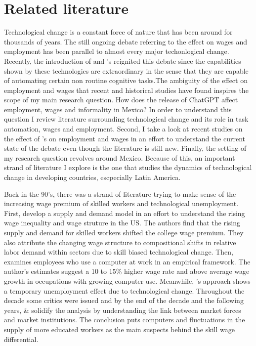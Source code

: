 \section{Related literature}

Technological change is a constant force of nature that has been around for thousands of years. The still ongoing debate referring to the effect on wages and employment has been parallel to almost every major techonlogical change. Recently, the introduction of  and 's reignited this debate since the capabilities shown by these technologies are extraordinary in the sense that they are capable of automating certain non routine cognitive tasks.The ambiguity of the effect on employment and wages that recent and historical studies have found inspires the scope of my main research question. How does the release of ChatGPT affect employment, wages and informality in Mexico? In order to understand this question I review literature surrounding technological change and its role in task automation, wages and employment. Second, I take a look at recent studies on the effect of 's on employment and wages in an effort to understand the current state of the debate even though the literature is still new. Finally, the setting of my research question revolves around Mexico. Because of this, an important strand of literature I explore is the one that studies the dynamics of technological change in developing countries, escpecially Latin America.

Back in the 90's, there was a strand of literature trying to make sense of the increasing wage premium of skilled workers and technological unemployment. First, \cite{katz1992changes} develop a supply and demand model in an effort to understand the rising wage inequality and wage struture in the US. The authors find that the rising supply and demand for skilled workers shifted the college wage premium. They also attribute the changing wage structure to compositional shifts in relative labor demand within sectors due to skill biased technological change.  Then, \cite{krueger} examines employees who use a computer at work in an empirical framework. The author's estimates suggest a 10 to 15\% higher wage rate and above average wage growth in occupations with growing computer use. Meanwhile, \cite{cox}'s approach shows a temporary unemployment effect due to technological change. Throughout the decade some critics were issued \citep{dinardo} and by the end of the decade and the following years, \cite{katz1999} \& \cite{goldin2007} solidify the analysis by understanding the link between market forces and market institutions. The conclusion puts computers and fluctuations in the supply of more educated workers as the main suspects behind the skill wage differential.

